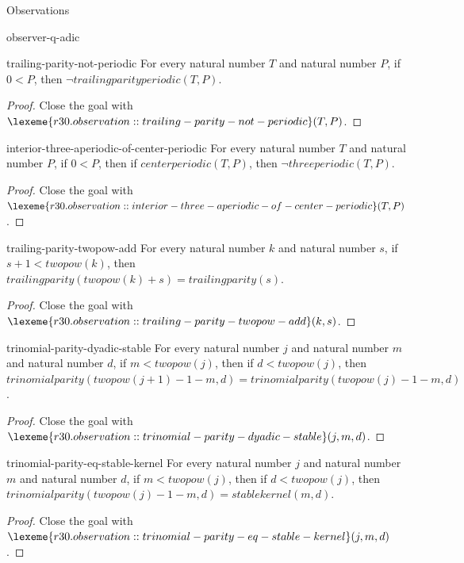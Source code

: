 \begin{lexlean}{Observations}
\begin{section}{observer-q-adic}
\begin{theorem}{trailing-parity-not-periodic}
For every natural number \(T\) and natural number \(P\), if \(0 < P\), then \(¬ trailingparityperiodic(T, P)\).
\begin{proof}
Close the goal with \(\lexeme{r30.observation::trailing-parity-not-periodic}(T, P)\).
\end{proof}
\end{theorem}

\begin{theorem}{interior-three-aperiodic-of-center-periodic}
For every natural number \(T\) and natural number \(P\), if \(0 < P\), then if \(centerperiodic(T, P)\), then \(¬ threeperiodic(T, P)\).
\begin{proof}
Close the goal with \(\lexeme{r30.observation::interior-three-aperiodic-of-center-periodic}(T, P)\).
\end{proof}
\end{theorem}

\begin{theorem}{trailing-parity-twopow-add}
For every natural number \(k\) and natural number \(s\), if \(s + 1 < twopow(k)\), then \(trailingparity(twopow(k) + s) = trailingparity(s)\).
\begin{proof}
Close the goal with \(\lexeme{r30.observation::trailing-parity-twopow-add}(k, s)\).
\end{proof}
\end{theorem}

\begin{theorem}{trinomial-parity-dyadic-stable}
For every natural number \(j\) and natural number \(m\) and natural number \(d\), if \(m < twopow(j)\), then if \(d < twopow(j)\), then \(trinomialparity(twopow(j + 1) - 1 - m, d) = trinomialparity(twopow(j) - 1 - m, d)\).
\begin{proof}
Close the goal with \(\lexeme{r30.observation::trinomial-parity-dyadic-stable}(j, m, d)\).
\end{proof}
\end{theorem}

\begin{theorem}{trinomial-parity-eq-stable-kernel}
For every natural number \(j\) and natural number \(m\) and natural number \(d\), if \(m < twopow(j)\), then if \(d < twopow(j)\), then \(trinomialparity(twopow(j) - 1 - m, d) = stablekernel(m, d)\).
\begin{proof}
Close the goal with \(\lexeme{r30.observation::trinomial-parity-eq-stable-kernel}(j, m, d)\).
\end{proof}
\end{theorem}


\end{section}
\end{lexlean}
